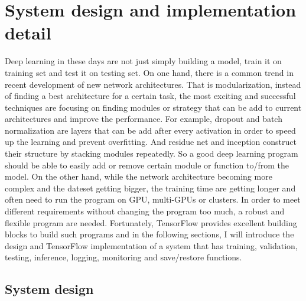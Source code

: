 \chapter{System design and implementation detail}
	\label{CH_04}
Deep learning in these days are not just simply building a model, train it on training set and test it on testing set. On one hand, there is a common trend in recent development of new network architectures. That is modularization, instead of finding a best architecture for a certain task, the most exciting and successful techniques are focusing on finding modules or strategy that can be add to current architectures and improve the performance. For example, dropout and batch normalization are layers that can be add after every activation in order to speed up the learning and prevent overfitting. And residue net and inception \cite{szegedy2015going} construct their structure by stacking modules repeatedly. So a good deep learning program should be able to easily add or remove certain module or function to/from the model. On the other hand, while the network architecture becoming more complex and the dateset getting bigger, the training time are getting longer and often need to run the program on GPU, multi-GPUs or clusters. In order to meet different requirements without changing the program too much, a robust and flexible program are needed. Fortunately, TensorFlow provides excellent building blocks to build such programs and in the following sections, I will introduce the design and TensorFlow implementation of a system that has training, validation, testing, inference, logging, monitoring and save/restore functions.

\section{System design}
